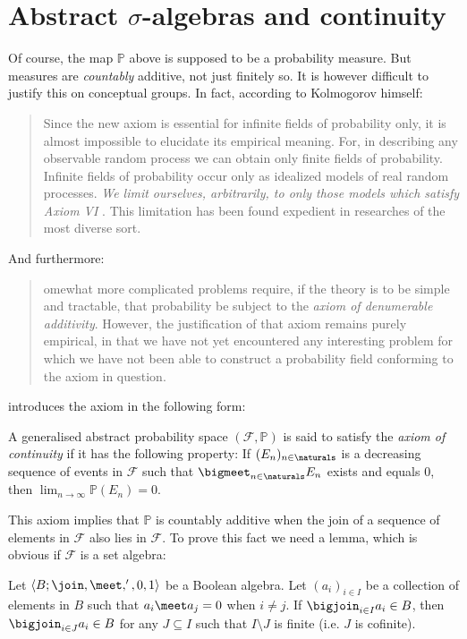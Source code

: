 \documentclass[article, a4paper, 11pt, oneside]{memoir}
\numberwithin{equation}{chapter}
\newcommand{\calF}{\mathcal{F}}
\renewcommand{\P}{\mathbb{P}}
\begin{document}
\chapter[Abstract sigma-algebras and continuity][Abstract $\sigma$-algebras and continuity]{Abstract $\sigma$-algebras and continuity}

Of course, the map $\P$ above is supposed to be a probability measure. But measures are \emph{countably} additive, not just finitely so. It is however difficult to justify this on conceptual groups. In fact, according to Kolmogorov himself:
%
\blockquote[\cite{kolmogorov1956}]{%
    Since the new axiom  is essential for infinite fields of probability only, it is almost impossible to elucidate its empirical meaning. \textelp{} For, in describing any observable random process we can obtain only finite fields of probability. Infinite fields of probability occur only as idealized models of real random processes. \emph{We limit ourselves, arbitrarily, to only those models which satisfy Axiom VI} . This limitation has been found expedient in researches of the most diverse sort.%
}
%
And furthermore:
%
\blockquote[\cite{kolmogorov1995}]{%
    omewhat more complicated problems require, if the theory is to be simple and tractable, that probability be subject to the \emph{axiom of denumerable additivity}. However, the justification of that axiom remains purely empirical, in that we have not yet encountered any interesting problem for which we have not been able to construct a probability field conforming to the axiom in question.%
}
%
\textcite{kolmogorov1956} introduces the axiom in the following form:

\begin{definition}
    A generalised abstract probability space $(\calF, \P)$ is said to satisfy the \emph{axiom of continuity} if it has the following property: If $(E_n)_{n\in\naturals}$ is a decreasing sequence of events in $\calF$ such that $\bigmeet_{n\in\naturals} E_n$ exists and equals $0$, then $\lim_{n\to\infty} \P(E_n) = 0$.
\end{definition}
%
This axiom implies that $\P$ is countably additive when the join of a sequence of elements in $\calF$ also lies in $\calF$. To prove this fact we need a lemma, which is obvious if $\calF$ is a set algebra:

\begin{lemma}
    Let $\langle B; \join, \meet, ', 0, 1 \rangle$ be a Boolean algebra. Let $(a_i)_{i \in I}$ be a collection of elements in $B$ such that $a_i \meet a_j = 0$ when $i \neq j$. If $\bigjoin_{i \in I} a_i \in B$, then $\bigjoin_{i \in J} a_i \in B$ for any $J \subseteq I$ such that $I \setminus J$ is finite (i.e. $J$ is cofinite).
\end{lemma}
\end{document}
